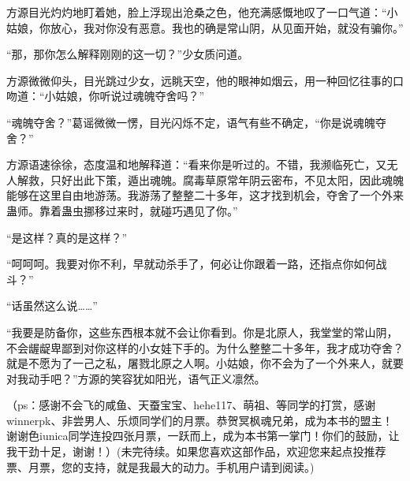 \begin{this_body}
方源目光灼灼地盯着她，脸上浮现出沧桑之色，他充满感慨地叹了一口气道：“小姑娘，你放心，我对你没有恶意。我也的确是常山阴，从见面开始，就没有骗你。”

“那，那你怎么解释刚刚的这一切？”少女质问道。

方源微微仰头，目光跳过少女，远眺天空，他的眼神如烟云，用一种回忆往事的口吻道：“小姑娘，你听说过魂魄夺舍吗？”

“魂魄夺舍？”葛谣微微一愣，目光闪烁不定，语气有些不确定，“你是说魂魄夺舍？”

方源语速徐徐，态度温和地解释道：“看来你是听过的。不错，我濒临死亡，又无人解救，只好出此下策，遁出魂魄。腐毒草原常年阴云密布，不见太阳，因此魂魄能够在这里自由地游荡。我游荡了整整二十多年，这才找到机会，夺舍了一个外来蛊师。靠着蛊虫挪移过来时，就碰巧遇见了你。”

“是这样？真的是这样？”

“呵呵呵。我要对你不利，早就动杀手了，何必让你跟着一路，还指点你如何战斗？”

“话虽然这么说……”

“我要是防备你，这些东西根本就不会让你看到。你是北原人，我堂堂的常山阴，不会龌龊卑鄙到对你这样的小女娃下手的。为什么整整二十多年，我才成功夺舍？就是不愿为了一己之私，屠戮北原之人啊。小姑娘，你不会为了一个外来人，就要对我动手吧？”方源的笑容犹如阳光，语气正义凛然。

（ps：感谢不会飞的咸鱼、天蚕宝宝、hehe117、萌祖、等同学的打赏，感谢winnerpk、非尝男人、乐烦同学们的月票。恭贺冥枫魂兄弟，成为本书的盟主！谢谢色iunica同学连投四张月票，一跃而上，成为本书第一掌门！你们的鼓励，让我干劲十足，谢谢！）(未完待续。如果您喜欢这部作品，欢迎您来起点投推荐票、月票，您的支持，就是我最大的动力。手机用户请到阅读。)

\end{this_body}

